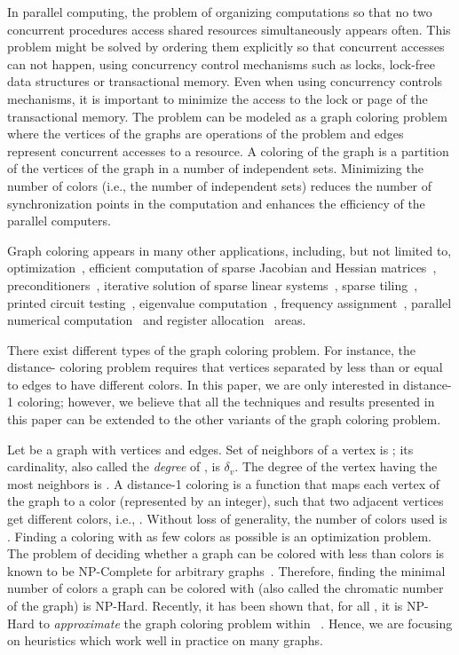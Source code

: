 \documentclass{article}
\newcommand{\degree}[1]{\ensuremath{\delta_{#1}}}
\begin{document}
In parallel computing, the problem of organizing
computations so that no two concurrent procedures access shared
resources simultaneously appears often. This problem might be solved by ordering
them explicitly so that concurrent accesses can not happen, using
concurrency control mechanisms such as locks, lock-free data structures
or transactional memory. Even when using concurrency controls
mechanisms, it is important to minimize the access to the lock or page
of the transactional memory. The problem can be modeled as a graph
coloring problem where the vertices of the graphs are operations of
the problem and edges represent concurrent accesses to a resource. A
coloring of the graph is a partition of the vertices of the graph in a number of independent
sets. Minimizing the number of colors (i.e., the number of independent sets) reduces the number of
synchronization points in the computation and enhances the efficiency
of the parallel computers. 

Graph coloring appears in many other applications, including, but not
limited to, optimization~\cite{CM83}, efficient computation of sparse Jacobian and Hessian
matrices~\cite{GMP05}, preconditioners~\cite{Saad99}, iterative solution of sparse linear
systems~\cite{Jones94}, sparse tiling~\cite{Strout02}, printed circuit
testing~\cite{Garey_circuit}, eigenvalue computation~\cite{Manne98aparallel}, frequency assignment~\cite{gamst_freq}, parallel numerical computation~\cite{ABC94} and register allocation~\cite{Chaitin} areas.

There exist different types of the graph coloring problem. For instance, 
the distance- coloring problem requires that vertices separated by less 
than or equal to  edges to have different colors.
In this paper, we are only interested in distance-1
coloring; however, we believe that all the techniques and results presented
in this paper can be extended to the other variants of the graph
coloring problem.

Let  be a graph with  vertices and 
edges. Set of neighbors of a vertex  is ; its
cardinality, also called the {\em degree} of , is \degree{v}. The
degree of the vertex having the most neighbors is . A distance-1 coloring  is a function
that maps each vertex of the graph to a color (represented by an
integer), such that two adjacent vertices get different colors,
i.e., . Without
loss of generality, the number of colors used is . Finding a coloring with as few colors as possible
is an optimization problem. The problem of deciding whether a graph
can be colored with less than  colors is known to be NP-Complete for
arbitrary graphs~\cite{matula_SL}. Therefore, finding the minimal
number of colors a graph can be colored with (also called the
chromatic number of the graph) is
NP-Hard.  Recently, it has been shown that, for all , it
is NP-Hard to {\em approximate} the graph coloring problem within
~\cite{Zuckerman}. Hence, we are focusing on 
heuristics which work well in practice on many graphs.
\end{document}
